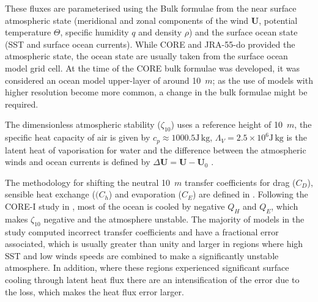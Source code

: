 These fluxes are parameterised using the Bulk formulae \citep{Large2008} from the near surface atmospheric state (meridional and zonal components of the wind $\boldsymbol{U}$, potential temperature $\Theta$, specific humidity $q$ and density $\rho$) %
and the surface ocean state (SST and surface ocean currents). While CORE and JRA-55-do provided the atmospheric state, the ocean state are usually taken from the surface ocean model grid cell. At the time of the CORE bulk formulae was developed, it was considered an ocean model upper-layer of around 10~$m$; as the use of models with higher resolution become more common, a change in the bulk formulae might be required.

The dimensionless atmospheric stability ($\zeta_{10}$) uses a reference height of 10~$m$, the specific heat capacity of air is given by $c_{p} \approx 1000.5 \text{J}\,\text{kg}$, $\Lambda_{V} = 2.5 \times 10^{6} \text{J}\,\text{kg}$ is the latent heat of vaporisation for water and the difference between the atmospheric winds and ocean currents is defined by $\Delta \boldsymbol{U} = \boldsymbol{U} - \boldsymbol{U}_{0}$ \citep{Pacanowski1987}.

The methodology for shifting the neutral 10~$m$ transfer coefficients for drag ($C_{D}$), sensible heat exchange ($(C_{h}$) and evaporation ($C_{E}$) are defined in \cite{Large2004}. Following the CORE-I study in \cite{Griffies2009}, most of the ocean is cooled by negative $Q_{H}$ and $Q_{E}$, which makes $\zeta_{10}$ negative and the atmosphere unstable. The majority of models in the \cite{Griffies2009} study computed incorrect transfer coefficients and have a fractional error associated, which is usually greater than unity and larger in regions where high SST and low winds speeds are combined to make a significantly unstable atmosphere. In addition, where these regions experienced significant surface cooling through latent heat flux there are an intensification of the error due to the loss, which makes the heat flux error larger.

